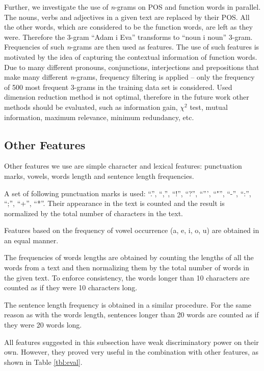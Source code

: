 \documentclass{llncs}
\begin{document}
Further, we investigate the use of \emph{n}-grams on POS and function words in
parallel. The nouns, verbs and adjectives in a given text are replaced by their
POS. All the other words, which are considered to be the function words, are
left as they were. Therefore the 3-gram ``Adam i Eva'' transforms to ``noun i
noun'' 3-gram. Frequencies of such \emph{n}-grams are then used as features.
The use of such features is motivated by the idea of capturing the contextual
information of function words. Due to many different pronouns, conjunctions,
interjections and prepositions that make many different \emph{n}-grams, frequency
filtering is applied -- only the frequency of 500 most frequent 3-grams in the
training data set is considered. Used dimension reduction method is not optimal,
therefore in the future work other methods should be evaluated, such as
information gain, $\chi^2$ test, mutual information, maximum relevance, minimum
redundancy, etc.

\subsection{Other Features}
\label{sec:znacajke-manje}
Other features we use are simple character and lexical features:
punctuation marks, vowels, words length and sentence length frequencies.

A set of following punctuation marks is used: ``.'', ``,'', ``!'', ``?'',
``''', ``"'', ``-'', ``:'', ``;'', ``+'', ``*''. Their appearance in the text is counted and
the result is normalized by the total number of characters in the text. 

Features based on the frequency of vowel occurrence (a, e, i, o, u) are
obtained in an equal manner.

The frequencies of words lengths are obtained by counting the lengths of all
the words from a text and then normalizing them by the total number of words in
the given text. To enforce consistency, the words longer than 10 characters are
counted as if they were 10 characters long.

The sentence length frequency is obtained in a similar procedure.
For the same reason as with the words length, sentences longer than 20 words are
counted as if they were 20 words long.

All features suggested in this subsection have weak discriminatory power
on their own. However, they proved very useful in the combination with other features, as
shown in Table \ref{tbl:eval}.
\end{document}
